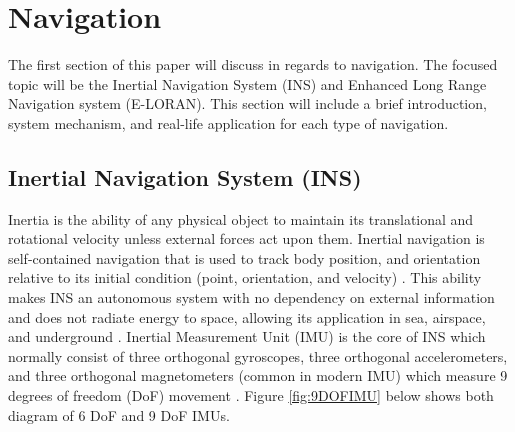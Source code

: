 \newpage
\setcounter{page}{1}
\justifying
\noindent

\section{Navigation}
The first section of this paper will discuss in regards to navigation. The focused topic will be the Inertial Navigation System (INS) and Enhanced Long Range Navigation system (E-LORAN). This section will include a brief introduction, system mechanism, and real-life application for each type of navigation.

\subsection{Inertial Navigation System (INS)}
Inertia is the ability of any physical object to maintain its translational and rotational velocity unless external forces act upon them. Inertial navigation is self-contained navigation that is used to track body position, and orientation relative to its initial condition (point, orientation, and velocity) \cite{Woodman2007NumberNavigation}\cite{Ribbens2003AircraftInstruments}. This ability makes INS an autonomous system with no dependency on external information and does not radiate energy to space, allowing its application in sea, airspace, and underground \cite{2018MiniatureUnit}. Inertial Measurement Unit (IMU) is the core of INS which normally consist of three orthogonal gyroscopes, three orthogonal accelerometers, and three orthogonal magnetometers (common in modern IMU) which measure 9 degrees of freedom (DoF) movement \cite{Christ2014NavigationalSensors}. Figure \ref{fig:9DOFIMU} below shows both diagram of 6 DoF and 9 DoF IMUs.\\

